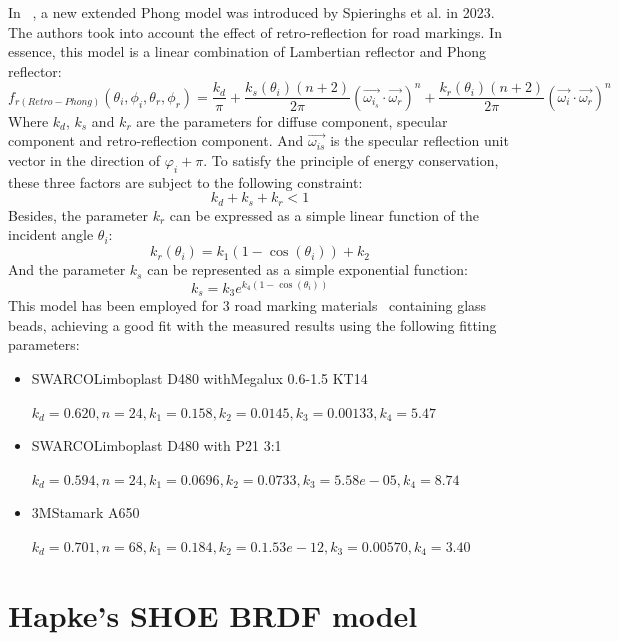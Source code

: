 In ~\cite{2023_Spieringhs}, a new extended Phong model was introduced by Spieringhs et al. in 2023.
The authors took into account the effect of retro-reflection for road markings.
In essence, this model is a linear combination of Lambertian reflector and Phong reflector:
\begin{equation}
    f_{r(Retro-Phong)}(\theta_i, \phi_i, \theta_r, \phi_r) = \frac{k_d}{\pi}%
    + \frac{k_s(\theta_i) (n + 2)}{2 \pi} \left( \overrightarrow{\omega_{i_s}} \cdot \overrightarrow{\omega_r} \right)^n%
    + \frac{k_r(\theta_i) (n + 2)}{2 \pi} \left(\overrightarrow{\omega_i} \cdot \overrightarrow{\omega_r}\right)^n
\end{equation}
Where $k_d$, $k_s$ and $k_r$ are the parameters for diffuse component, specular component and retro-reflection component.
And $\overrightarrow{\omega_{is}}$ is the specular reflection unit vector in the direction of $\varphi_i + \pi$.
To satisfy the principle of energy conservation, these three factors are subject to the following constraint:
\[
    k_d + k_s + k_r <1
\]
Besides, the parameter $k_r$ can be expressed as a simple linear function of the incident angle $\theta_i$:
\[
    k_r(\theta_i) = k_1(1-\cos(\theta_i)) + k_2
\]
And the parameter $k_s$ can be represented as a simple exponential function:
\[
    k_s = k_3 e^{k_4(1-\cos(\theta_i))}
\]
This model has been employed for 3 road marking materials~\cite{2023_Spieringhs} containing glass beads, achieving a good fit with the measured results using the following fitting parameters:
\begin{itemize}
    \item SWARCOLimboplast D480 withMegalux 0.6-1.5 KT14

          $k_d = 0.620, n = 24, k_1 = 0.158, k_2 = 0.0145, k_3 = 0.00133, k_4 = 5.47$

    \item SWARCOLimboplast D480 with P21 3:1

          $k_d = 0.594, n = 24, k_1 = 0.0696, k_2 = 0.0733, k_3 = 5.58e-05, k_4 = 8.74$

    \item 3MStamark A650

          $k_d = 0.701, n = 68, k_1 = 0.184, k_2 = 0.1.53e-12, k_3 = 0.00570, k_4 = 3.40$
\end{itemize}


\section{Hapke's SHOE BRDF model}
\label{sec:brdf-Hapke}

